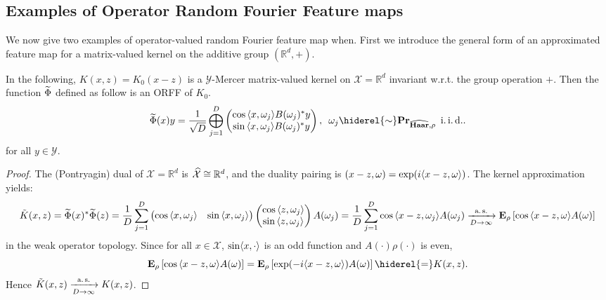\subsection{Examples of Operator Random Fourier Feature maps}
\label{subsec:examples_ORFF}
We now give two examples of operator-valued random Fourier feature map when. First we introduce the general form of an approximated feature map for a matrix-valued kernel on the additive group $(\mathbb{R}^d,+)$.
\begin{example}\label{ex:additive_group}
In the following, $K(x,z)=K_0(x-z)$ is a $\mathcal{Y}$-Mercer matrix-valued kernel on $\mathcal{X}=\mathbb{R}^d$ invariant w.r.t. the group operation $+$. %
Then the function $\widetilde{\Phi}$ defined as follow is an \acl{ORFF} of $K_{0}$.
\begin{dmath*}
\tildePhi{\omega}(x)y=\frac{1}{\sqrt{D}}\Vect_{j=1}^D\begin{pmatrix}\cos{\inner{x,\omega_j}}B(\omega_j)^\adjoint y \\ \sin{\inner{x,\omega_j}}B(\omega_j)^\adjoint y\end{pmatrix}, \enskip \omega_j \hiderel{\sim} \probability_{\dual{\Haar},\rho} \enskip\text{\iid}.
\end{dmath*}
for all $y\in\mathcal{Y}$.
\end{example}
\begin{proof}
The (Pontryagin) dual of $\mathcal{X}=\mathbb{R}^d$
is $\widehat{\mathcal{X}}\cong\mathbb{R}^d$, and the duality pairing is $(x-z,\omega)=\exp(i\langle x-z, \omega\rangle)$. The kernel approximation yields:
\begin{dmath*}
\tilde{K}(x,z)=\tildePhi{\omega}(x)^\adjoint \tildePhi{\omega}(z)
= \frac{1}{D} \sum_{j=1}^D \begin{pmatrix} \cos{\inner{x,\omega_j}} & \sin{\inner{x,\omega_j}} \end{pmatrix}\begin{pmatrix}\cos{\inner{z,\omega_j}} \\ \sin{\inner{z,\omega_j}} \end{pmatrix} A(\omega_j)
= \frac{1}{D} \sum_{j=1}^D \cos{\inner{x-z,\omega_j}}A(\omega_j) \\
\converges{\asurely}{D\to\infty}\expectation_\rho\left[\cos{\inner{x-z,\omega}}A(\omega)\right]
\end{dmath*}
in the weak operator topology. Since for all $x\in\mathcal{X}$, $\sin\langle x, \cdot\rangle$ is an odd function and $A(\cdot)\rho(\cdot)$ is even,
\begin{dmath*}
\expectation_\rho\left[\cos{\inner{x-z,\omega}}A(\omega)\right]=\expectation_\rho\left[\exp(-i\inner{x-z,\omega})A(\omega)\right]\hiderel{=}K(x,z).
\end{dmath*}
Hence $\tilde{K}(x,z)\xrightarrow[D\to\infty]{\text{a.\,s.}}K(x,z)$.
\end{proof}
